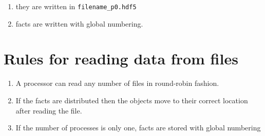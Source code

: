 \begin{enumerate}
\item they are written in {\tt filename\_p0.hdf5}
\item facts are written with global numbering.
\end{enumerate}
\section {Rules for reading data from files}

\begin{enumerate}
\item A processor can read any number of files in round-robin fashion. 
\item If the facts are distributed then the objects move to their
correct location after reading the file. 
\item If the number of processes is only one, facts are stored with
global numbering
\end{enumerate}

